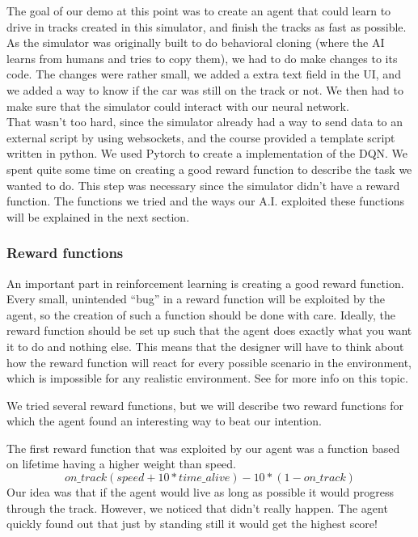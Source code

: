 \documentclass[12pt, conference, compsoc]{IEEEtran}
\begin{document}
The goal of our demo at this point was to create an agent that could learn to drive in tracks created in this simulator, and finish the tracks as fast as possible. As the simulator was originally built to do behavioral cloning (where the AI learns from humans and tries to copy them), we had to do make changes to its code. The changes were rather small, we added a extra text field in the UI, and we added a way to know if the car was still on the track or not. We then had to make sure that the simulator could interact with our neural network.\\
That wasn't too hard, since the simulator already had a way to send data to an external script by using websockets, and the course provided a template script written in python.
\newline
\newline
We used Pytorch \cite{PyTorch} to create a implementation of the DQN. We spent quite some time on creating a good reward function to describe the task we wanted to do. This step was necessary since the simulator didn't have a reward function. The functions we tried and the ways our A.I. exploited these functions will be explained in the next section.

\subsubsection{Reward functions}
An important part in reinforcement learning is creating a good reward function. Every small, unintended ``bug'' in a reward function will be exploited by the agent, so the creation of such a function should be done with care. Ideally, the reward function should be set up such that the agent does exactly what you want it to do and nothing else. This means that the designer will have to think about how the reward function will react for every possible scenario in the environment, which is impossible for any realistic environment. See \cite{drl-doesnt-work-yet} for more info on this topic.

We tried several reward functions, but we will describe two reward functions for which the agent found an interesting way to beat our intention.

The first reward function that was exploited by our agent was a function based on lifetime having a higher weight than speed.
$$on\_track(speed + 10*time\_alive ) - 10*(1-on\_track)$$
Our idea was that if the agent would live as long as possible it would progress through the track. However, we noticed that didn't really happen. The agent quickly found out that just by standing still it would get the highest score!
\end{document}
